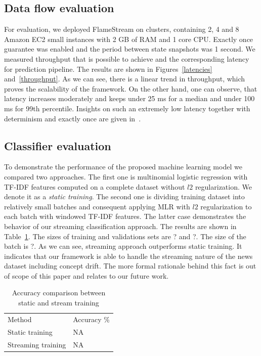\subsection{Data flow evaluation}

For evaluation, we deployed FlameStream on clusters, containing 2, 4 and 8 Amazon EC2 small instances with 2 GB of RAM and 1 core CPU. Exactly once guarantee was enabled and the period between state snapshots was 1 second. We measured throughput that is possible to achieve and the corresponding latency for prediction pipeline. The results are shown in Figures~\ref{latencies} and~\ref{throughput}. As we can see, there is a linear trend in throughput, which proves the scalability of the framework. On the other hand, one can observe, that latency increases moderately and keeps under 25 ms for a median and under 100 ms for 99th percentile. Insights on such an extremely low latency together with determinism and exactly once are given in~\cite{we2018beyondmr, we2018adbis}.

\subsection{Classifier evaluation}

To demonstrate the performance of the proposed machine learning model we compared two approaches. The first one is multinomial logistic regression with TF-IDF features computed on a complete dataset without $l2$ regularization. We denote it as a {\em static training}. The second one is dividing training dataset into relatively small batches and consequent applying MLR with $l2$ regularization to each batch with windowed TF-IDF features. The latter case demonstrates the behavior of our streaming classification approach. The results are shown in Table~\ref{accuracy}. The sizes of training and validations sets are ? and ?. The size of the batch is ?. As we can see, streaming approach outperforms static training. It indicates that our framework is able to handle the streaming nature of the news dataset including concept drift. The more formal rationale behind this fact is out of scope of this paper and relates to our future work.

\begin{table}[htbp]
\begin{tabular}{ll}
Method          & Accuracy \% \\
Static training  & NA          \\
Streaming training & NA         
\end{tabular}
\caption{Accuracy comparison between static and stream training}
\label{accuracy}
\end{table}

